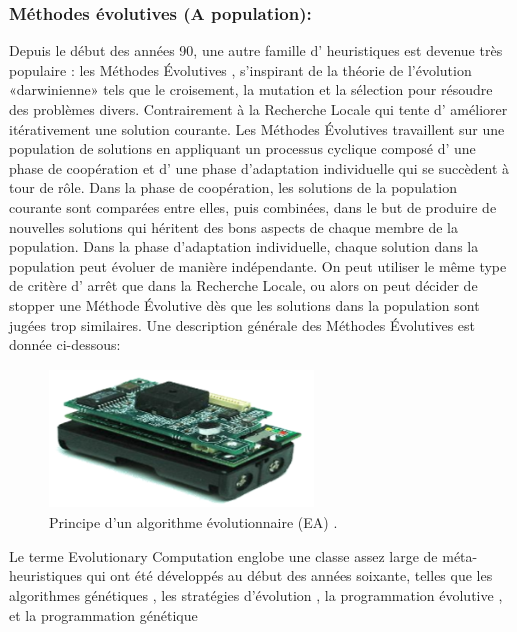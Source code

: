 \subsubsection{Méthodes évolutives (A population):}
Depuis le début des années 90, une autre famille d’ heuristiques est devenue très populaire : les Méthodes Évolutives \cite{hertz2000framework} , s’inspirant de la théorie de l’évolution «darwinienne»  tels que le croisement, la mutation et la sélection pour résoudre des problèmes divers. Contrairement à la Recherche Locale qui tente d’ améliorer itérativement une solution courante. Les Méthodes Évolutives travaillent sur une population de solutions en appliquant un processus cyclique composé d’ une phase de coopération et d’ une phase d’adaptation individuelle qui se succèdent à tour de rôle. Dans la phase de coopération, les solutions de la population courante sont comparées entre elles, puis combinées, dans le but de produire de nouvelles solutions qui héritent des bons aspects de chaque membre de la population. Dans la phase d’adaptation individuelle, chaque solution dans la population peut évoluer de manière indépendante. On peut utiliser le même type de critère d’ arrêt que dans la Recherche Locale, ou alors on peut décider de stopper une Méthode Évolutive dès que les solutions dans la population sont jugées trop similaires. Une description générale des Méthodes Évolutives est donnée ci-dessous:

\begin{figure}[h]
	\centering
	\includegraphics[width=7cm,height=3.7cm]{Chap1/1.png}
	\caption{Principe d’un algorithme évolutionnaire (EA) \cite{dreo2003metaheuristiques}.}
	\label{fig:CSF}
\end{figure}

Le terme Evolutionary Computation englobe une classe assez large de méta-heuristiques qui ont été développés au début des années soixante, telles que les algorithmes génétiques \cite{holland1975adaptation}, les stratégies d’évolution \cite{rechenberg1973evolutionsstrategie} , la programmation évolutive \cite{fogel1966artificial}, et la programmation génétique \cite{koza1992genetic}

